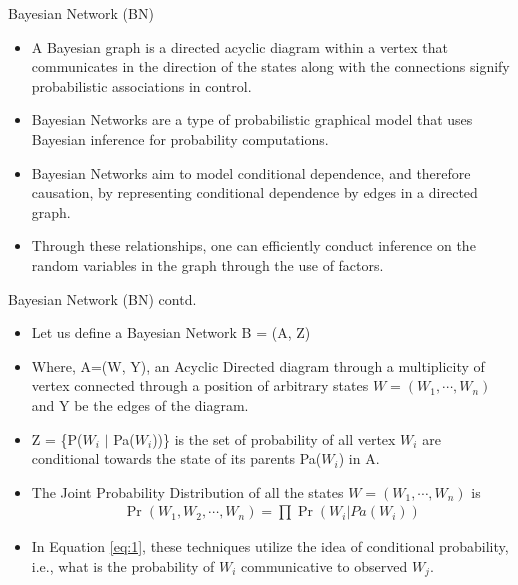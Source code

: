 \documentclass{beamer}
\providecommand{\pr}[1]{\ensuremath{\Pr\left(#1\right)}}
\begin{document}
    \begin{frame}
      \begin{block}{Bayesian Network (BN)}
            \begin{itemize} 
                 \item A Bayesian graph is a directed acyclic diagram within a vertex that communicates in the direction of the states along with the connections signify probabilistic associations in control.    
                 \item Bayesian Networks are a type of probabilistic graphical model that uses Bayesian inference for probability computations. 
                 \item Bayesian Networks aim to model conditional dependence, and therefore causation, by representing conditional dependence by edges in a directed graph.
                 \item Through these relationships, one can efficiently conduct inference on the random variables in the graph through the use of factors.
    \end{itemize}
    \end{block}
    \end{frame}
    \begin{frame}
    \begin{block}{Bayesian Network (BN) contd.}
       \begin{itemize}
           \item Let us define a Bayesian Network B = (A, Z) 
           \item Where, A=(W, Y), an Acyclic Directed diagram through a multiplicity of vertex connected through a position of arbitrary states $W =( W_1,\cdots, W_n)$ and Y be the edges of the diagram.
           \item  Z = \{P($W_i$ $|$ Pa($W_i$))\} is the set of probability of all vertex $W_i$ are conditional towards the state of its parents Pa($W_i$) in A.
           \item The Joint Probability Distribution of all the states $W =( W_1,\cdots, W_n)$ is 
           \begin{align}
               \pr{W_1,W_2,\cdots,W_n} = \prod \pr{W_i | Pa(W_i)} \label{eq:1}
           \end{align}
           \item In Equation \eqref{eq:1}, these techniques utilize the idea of conditional  probability, i.e., what is the probability of $W_i$ communicative to observed $W_j$.
       \end{itemize}
    \end{block}
\end{frame}
\end{document}
